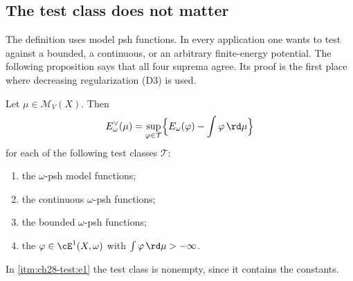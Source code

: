 \subsection{The test class does not matter}
\label{sec:ch28-test-class}

The definition uses model psh functions.  In every application one wants to
test against a bounded, a continuous, or an arbitrary finite-energy
potential.  The following proposition says that all four suprema agree.  Its
proof is the first place where decreasing regularization
\textup{(D3)} is used.

\begin{proposition}
\label{prop:ch28-test-class}
Let $\mu\in\mathcal M_V(X)$.  Then
\begin{equation}
\label{eq:ch28-test-class}
 E^\vee_\omega(\mu)
 =\sup_{\varphi\in\mathcal T}
   \Bigl\{E_\omega(\varphi)-\int\varphi\,\rd\mu\Bigr\}
\end{equation}
for each of the following test classes $\mathcal T$:
\begin{enumerate}
\item\label{itm:ch28-test:model}
 the $\omega$-psh model functions;
\item\label{itm:ch28-test:cont}
 the continuous $\omega$-psh functions;
\item\label{itm:ch28-test:bdd}
 the bounded $\omega$-psh functions;
\item\label{itm:ch28-test:e1}
 the $\varphi\in\cE^1(X,\omega)$ with $\int\varphi\,\rd\mu>-\infty$.
\end{enumerate}
In \cref{itm:ch28-test:e1} the test class is nonempty, since it contains the
constants.
\end{proposition}

